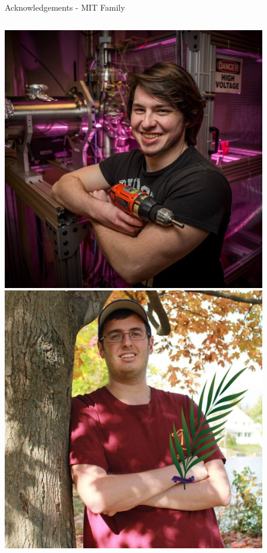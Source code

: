 \documentclass[aspectratio=169]{beamer}
\begin{document}
\begin{frame}{Acknowledgements - MIT Family }
\begin{columns}
                \centering
                \includegraphics[width=0.865\textwidth]{people/band/loyd.png}
                \includegraphics[width=0.865\textwidth]{people/band/bdot.png}
                \centering

\end{columns}
\end{frame}
\end{document}

